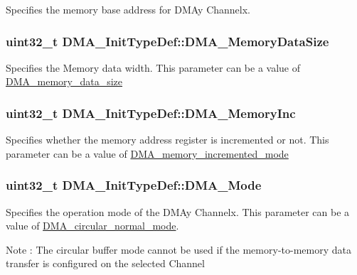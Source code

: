 \label{structDMA__InitTypeDef_a41e7d463f0cfbcedf3170d7d27d088df}
Specifies the memory base address for DMAy Channelx. \hypertarget{structDMA__InitTypeDef_a74bb71921c4d198d6cf1979c120f694f}{
\subsubsection[{DMA\_\-MemoryDataSize}]{\setlength{\rightskip}{0pt plus 5cm}uint32\_\-t {\bf DMA\_\-InitTypeDef::DMA\_\-MemoryDataSize}}}
\label{structDMA__InitTypeDef_a74bb71921c4d198d6cf1979c120f694f}
Specifies the Memory data width. This parameter can be a value of \hyperlink{group__DMA__memory__data__size}{DMA\_\-memory\_\-data\_\-size} \hypertarget{structDMA__InitTypeDef_aaf69c680a297ec01a2ed613289e691a1}{
\subsubsection[{DMA\_\-MemoryInc}]{\setlength{\rightskip}{0pt plus 5cm}uint32\_\-t {\bf DMA\_\-InitTypeDef::DMA\_\-MemoryInc}}}
\label{structDMA__InitTypeDef_aaf69c680a297ec01a2ed613289e691a1}
Specifies whether the memory address register is incremented or not. This parameter can be a value of \hyperlink{group__DMA__memory__incremented__mode}{DMA\_\-memory\_\-incremented\_\-mode} \hypertarget{structDMA__InitTypeDef_a8adbe6f3e46471d109afaa3111dce220}{
\subsubsection[{DMA\_\-Mode}]{\setlength{\rightskip}{0pt plus 5cm}uint32\_\-t {\bf DMA\_\-InitTypeDef::DMA\_\-Mode}}}
\label{structDMA__InitTypeDef_a8adbe6f3e46471d109afaa3111dce220}
Specifies the operation mode of the DMAy Channelx. This parameter can be a value of \hyperlink{group__DMA__circular__normal__mode}{DMA\_\-circular\_\-normal\_\-mode}. \begin{DoxyNote}{Note}
: The circular buffer mode cannot be used if the memory-\/to-\/memory data transfer is configured on the selected Channel 
\end{DoxyNote}
